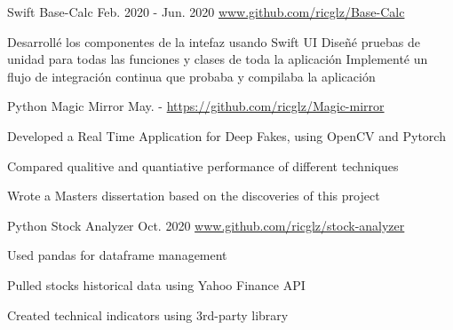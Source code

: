 \begin{cventries}
  \cventry
    {Swift}
    {Base-Calc} %
    {Feb. 2020 - Jun. 2020} %
    {\url{www.github.com/ricglz/Base-Calc}} %
    {
      \begin{cvitems} %
         {{
          Desarrollé los componentes de la intefaz usando Swift UI
        }}
         {{
          Diseñé pruebas de unidad para todas las funciones y clases de toda la aplicación
        }}
         {{
          Implementé un flujo de integración continua que probaba y compilaba la aplicación
        }}
      \end{cvitems}
    }

  \cventry
    {Python}
    {Magic Mirror} %
    {May. - } %
    {\url{https://github.com/ricglz/Magic-mirror}} %
    {
      \begin{cvitems} %
        \item {Developed a Real Time Application for Deep Fakes, using OpenCV and Pytorch}
        \item {Compared qualitive and quantiative performance of different techniques}
        \item {Wrote a Masters dissertation based on the discoveries of this project}
      \end{cvitems}
    }
  \cventry
    {Python}
    {Stock Analyzer} %
    {Oct. 2020} %
    {\url{www.github.com/ricglz/stock-analyzer}} %
    {
      \begin{cvitems} %
        \item {Used pandas for dataframe management}
        \item {Pulled stocks historical data using Yahoo Finance API}
        \item {Created technical indicators using 3rd-party library}
      \end{cvitems}
    }


\end{cventries}
